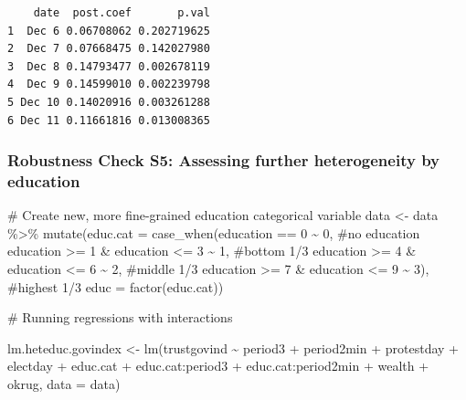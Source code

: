 \documentclass[
  letterpaper,
  DIV=11,
  numbers=noendperiod]{scrartcl}
\newenvironment{Shaded}{\begin{snugshade}}{\end{snugshade}}
\newcommand{\AttributeTok}[1]{\textcolor[rgb]{0.40,0.45,0.13}{#1}}
\newcommand{\CommentTok}[1]{\textcolor[rgb]{0.37,0.37,0.37}{#1}}
\newcommand{\DecValTok}[1]{\textcolor[rgb]{0.68,0.00,0.00}{#1}}
\newcommand{\FunctionTok}[1]{\textcolor[rgb]{0.28,0.35,0.67}{#1}}
\newcommand{\NormalTok}[1]{\textcolor[rgb]{0.00,0.23,0.31}{#1}}
\newcommand{\OtherTok}[1]{\textcolor[rgb]{0.00,0.23,0.31}{#1}}
\newcommand{\SpecialCharTok}[1]{\textcolor[rgb]{0.37,0.37,0.37}{#1}}
\begin{document}
\begin{verbatim}
    date  post.coef       p.val
1  Dec 6 0.06708062 0.202719625
2  Dec 7 0.07668475 0.142027980
3  Dec 8 0.14793477 0.002678119
4  Dec 9 0.14599010 0.002239798
5 Dec 10 0.14020916 0.003261288
6 Dec 11 0.11661816 0.013008365
\end{verbatim}

\subsubsection{Robustness Check S5: Assessing further heterogeneity by
education}\label{robustness-check-s5-assessing-further-heterogeneity-by-education}

\begin{Shaded}
\begin{Highlighting}[]
\CommentTok{\# Create new, more fine{-}grained education categorical variable}
\NormalTok{data }\OtherTok{\textless{}{-}}\NormalTok{ data }\SpecialCharTok{\%\textgreater{}\%} 
  \FunctionTok{mutate}\NormalTok{(}\AttributeTok{educ.cat =} \FunctionTok{case\_when}\NormalTok{(education }\SpecialCharTok{==} \DecValTok{0} \SpecialCharTok{\textasciitilde{}} \DecValTok{0}\NormalTok{, }\CommentTok{\#no education}
\NormalTok{                              education }\SpecialCharTok{\textgreater{}=} \DecValTok{1} \SpecialCharTok{\&}\NormalTok{ education }\SpecialCharTok{\textless{}=} \DecValTok{3} \SpecialCharTok{\textasciitilde{}} \DecValTok{1}\NormalTok{, }\CommentTok{\#bottom 1/3}
\NormalTok{                              education }\SpecialCharTok{\textgreater{}=} \DecValTok{4} \SpecialCharTok{\&}\NormalTok{ education }\SpecialCharTok{\textless{}=} \DecValTok{6} \SpecialCharTok{\textasciitilde{}} \DecValTok{2}\NormalTok{, }\CommentTok{\#middle 1/3}
\NormalTok{                              education }\SpecialCharTok{\textgreater{}=} \DecValTok{7} \SpecialCharTok{\&}\NormalTok{ education }\SpecialCharTok{\textless{}=} \DecValTok{9} \SpecialCharTok{\textasciitilde{}} \DecValTok{3}\NormalTok{), }\CommentTok{\#highest 1/3}
         \AttributeTok{educ =} \FunctionTok{factor}\NormalTok{(educ.cat))}


\CommentTok{\# Running regressions with interactions}

\NormalTok{lm.heteduc.govindex }\OtherTok{\textless{}{-}} \FunctionTok{lm}\NormalTok{(trustgovind }\SpecialCharTok{\textasciitilde{}}\NormalTok{ period3 }\SpecialCharTok{+}\NormalTok{ period2min }\SpecialCharTok{+}\NormalTok{ protestday }\SpecialCharTok{+}\NormalTok{ electday }\SpecialCharTok{+}
\NormalTok{                            educ.cat }\SpecialCharTok{+}\NormalTok{ educ.cat}\SpecialCharTok{:}\NormalTok{period3 }\SpecialCharTok{+}\NormalTok{ educ.cat}\SpecialCharTok{:}\NormalTok{period2min }\SpecialCharTok{+}
\NormalTok{                            wealth }\SpecialCharTok{+}\NormalTok{ okrug, }\AttributeTok{data =}\NormalTok{ data)}


\end{Highlighting}
\end{Shaded}
\end{document}
